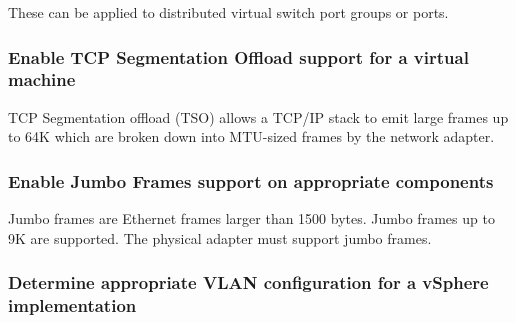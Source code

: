 These can be applied to distributed virtual switch port groups or ports.

\subsubsection{Enable TCP Segmentation Offload support for a virtual machine}

TCP Segmentation offload (TSO) allows a TCP/IP stack to emit large frames
up to 64K which are broken down into MTU-sized frames by the network adapter.

\subsubsection{Enable Jumbo Frames support on appropriate components}

Jumbo frames are Ethernet frames larger than 1500 bytes. Jumbo frames up to 9K
are supported. The physical adapter must support jumbo frames.

\subsubsection{Determine appropriate VLAN configuration for a vSphere implementation}
